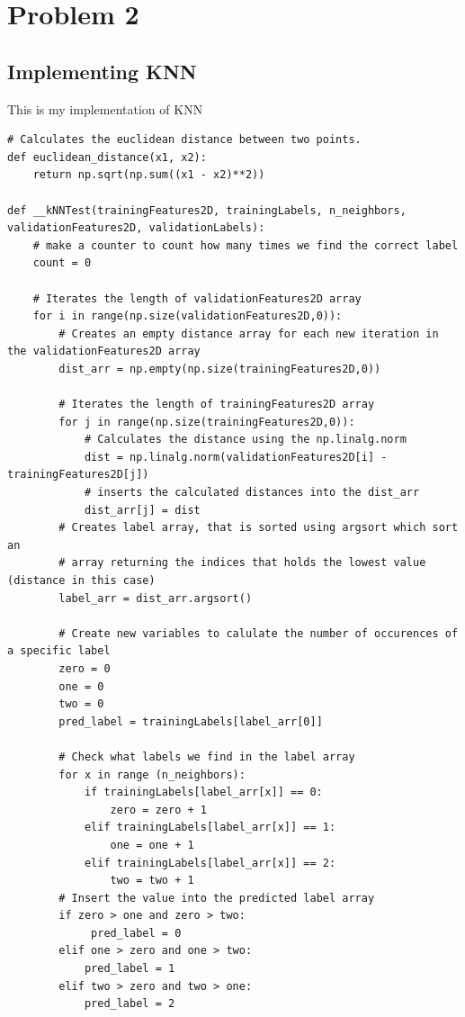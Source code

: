 \section{Problem 2}
\subsection{Implementing KNN}

This is my implementation of KNN
\begin{verbatim}
# Calculates the euclidean distance between two points.
def euclidean_distance(x1, x2):
    return np.sqrt(np.sum((x1 - x2)**2))

def __kNNTest(trainingFeatures2D, trainingLabels, n_neighbors, validationFeatures2D, validationLabels):
    # make a counter to count how many times we find the correct label
    count = 0

    # Iterates the length of validationFeatures2D array
    for i in range(np.size(validationFeatures2D,0)):
        # Creates an empty distance array for each new iteration in the validationFeatures2D array
        dist_arr = np.empty(np.size(trainingFeatures2D,0))

        # Iterates the length of trainingFeatures2D array
        for j in range(np.size(trainingFeatures2D,0)):
            # Calculates the distance using the np.linalg.norm
            dist = np.linalg.norm(validationFeatures2D[i] - trainingFeatures2D[j])
            # inserts the calculated distances into the dist_arr
            dist_arr[j] = dist
        # Creates label array, that is sorted using argsort which sort an
        # array returning the indices that holds the lowest value (distance in this case)
        label_arr = dist_arr.argsort()

        # Create new variables to calulate the number of occurences of a specific label
        zero = 0
        one = 0
        two = 0
        pred_label = trainingLabels[label_arr[0]]

        # Check what labels we find in the label array
        for x in range (n_neighbors):
            if trainingLabels[label_arr[x]] == 0:
                zero = zero + 1
            elif trainingLabels[label_arr[x]] == 1:
                one = one + 1
            elif trainingLabels[label_arr[x]] == 2:
                two = two + 1
        # Insert the value into the predicted label array
        if zero > one and zero > two:
             pred_label = 0
        elif one > zero and one > two:
            pred_label = 1
        elif two > zero and two > one:
            pred_label = 2


\end{verbatim}
